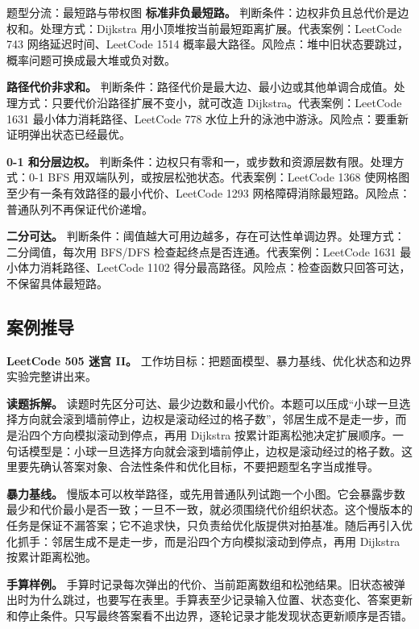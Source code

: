 \begin{principlebox}{题型分流：最短路与带权图}
\textbf{标准非负最短路。}
判断条件：边权非负且总代价是边权和。处理方式：Dijkstra 用小顶堆按当前最短距离扩展。代表案例：LeetCode 743 网络延迟时间、LeetCode 1514 概率最大路径。风险点：堆中旧状态要跳过，概率问题可换成最大堆或负对数。

\textbf{路径代价非求和。}
判断条件：路径代价是最大边、最小边或其他单调合成值。处理方式：只要代价沿路径扩展不变小，就可改造 Dijkstra。代表案例：LeetCode 1631 最小体力消耗路径、LeetCode 778 水位上升的泳池中游泳。风险点：要重新证明弹出状态已经最优。

\textbf{0-1 和分层边权。}
判断条件：边权只有零和一，或步数和资源层数有限。处理方式：0-1 BFS 用双端队列，或按层松弛状态。代表案例：LeetCode 1368 使网格图至少有一条有效路径的最小代价、LeetCode 1293 网格障碍消除最短路。风险点：普通队列不再保证代价递增。

\textbf{二分可达。}
判断条件：阈值越大可用边越多，存在可达性单调边界。处理方式：二分阈值，每次用 BFS/DFS 检查起终点是否连通。代表案例：LeetCode 1631 最小体力消耗路径、LeetCode 1102 得分最高路径。风险点：检查函数只回答可达，不保留具体最短路。

\end{principlebox}

\subsection{案例推导}

\noindent\textbf{LeetCode 505 迷宫 II。} 工作坊目标：把题面模型、暴力基线、优化状态和边界实验完整讲出来。

\textbf{读题拆解。} 读题时先区分可达、最少边数和最小代价。本题可以压成“小球一旦选择方向就会滚到墙前停止，边权是滚动经过的格子数”，邻居生成不是走一步，而是沿四个方向模拟滚动到停点，再用 Dijkstra 按累计距离松弛决定扩展顺序。一句话模型是：小球一旦选择方向就会滚到墙前停止，边权是滚动经过的格子数。这里要先确认答案对象、合法性条件和优化目标，不要把题型名字当成推导。

\textbf{暴力基线。} 慢版本可以枚举路径，或先用普通队列试跑一个小图。它会暴露步数最少和代价最小是否一致；一旦不一致，就必须围绕代价组织状态。这个慢版本的任务是保证不漏答案；它不追求快，只负责给优化版提供对拍基准。随后再引入优化抓手：邻居生成不是走一步，而是沿四个方向模拟滚动到停点，再用 Dijkstra 按累计距离松弛。

\textbf{手算样例。} 手算时记录每次弹出的代价、当前距离数组和松弛结果。旧状态被弹出时为什么跳过，也要写在表里。手算表至少记录输入位置、状态变化、答案更新和停止条件。只写最终答案看不出边界，逐轮记录才能发现状态更新顺序是否错。

